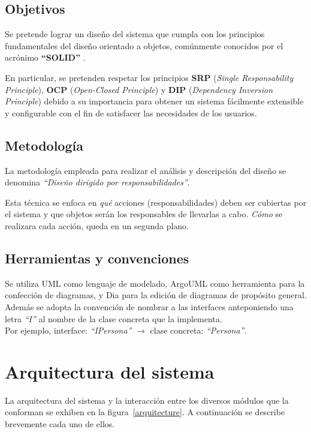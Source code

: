 \documentclass[12pt,a4paper,spanish]{article}
\begin{document}
\subsection{Objetivos}
Se pretende lograr un diseño del sistema que cumpla con los principios
fundamentales del diseño orientado a objetos, comúnmente conocidos por el
acrónimo \textbf{``SOLID''} \cite{martin}.

En particular, se pretenden respetar los principios \textbf{SRP}
(\textit{Single Responsability Principle}), \textbf{OCP} (\textit{Open-Closed
Principle}) y \textbf{DIP} (\textit{Dependency Inversion Principle})
debido a su importancia para obtener un sistema f\'acilmente extensible
y configurable con el fin de satisfacer las necesidades de los usuarios.
  
\subsection{Metodología}
La metodología empleada para realizar el análisis y descripción del
diseño se denomina \emph{``Diseño dirigido por responsabilidades''}\cite{rebecca}. 

Esta técnica se enfoca en \textit{qué} acciones
(responsabilidades) deben ser cubiertas por el sistema 
y que objetos serán los responsables de llevarlas a cabo.
\textit{Cómo} se realizara cada acción, queda en un segunda plano.

\subsection{Herramientas y convenciones}
Se utiliza UML\cite{uml} como lenguaje de modelado, ArgoUML\cite{argoUML}
como herramienta para la confección de diagramas, y Dia\cite{dia} para la edición
de diagramas de propósito general. Además se adopta la convención de nombrar a
 las interfaces anteponiendo una letra \textit{``I''} al nombre de la clase concreta
que la implementa. \\
Por ejemplo, interface: \textit{``IPersona''} $\to$
clase concreta: \textit{``Persona''}.

\section{Arquitectura del sistema}
\label{arquitectura}
La arquitectura del sistema y la interacción entre los diversos módulos que la conforman se exhiben en la figura~\ref{arquitecture}.	A continuación se describe brevemente cada uno de ellos.
\end{document}
